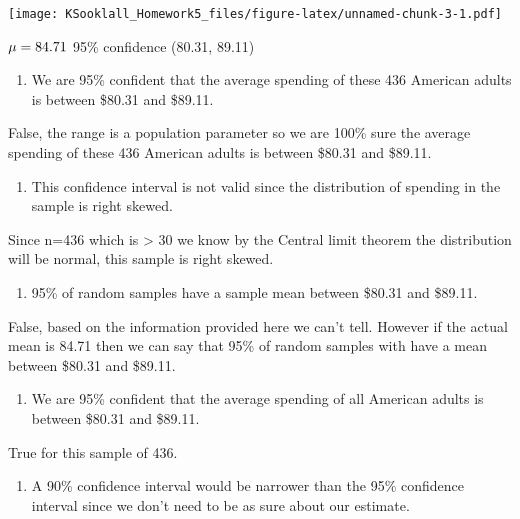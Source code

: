 \documentclass[
]{article}
\providecommand{\tightlist}{%
  \setlength{\itemsep}{0pt}\setlength{\parskip}{0pt}}
\begin{document}
\texttt{[image: KSooklall\_Homework5\_files/figure-latex/unnamed-chunk-3-1.pdf]}

\(\mu=84.71 \\\) 95\% confidence (80.31, 89.11)

\begin{enumerate}
\def\labelenumi{(\alph{enumi})}
\tightlist
\item
  We are 95\% confident that the average spending of these 436 American
  adults is between \$80.31 and \$89.11.
\end{enumerate}

False, the range is a population parameter so we are 100\% sure the
average spending of these 436 American adults is between \$80.31 and
\$89.11.

\begin{enumerate}
\def\labelenumi{(\alph{enumi})}
\setcounter{enumi}{1}
\tightlist
\item
  This confidence interval is not valid since the distribution of
  spending in the sample is right skewed.
\end{enumerate}

Since n=436 which is \textgreater{} 30 we know by the Central limit
theorem the distribution will be normal, this sample is right skewed.

\begin{enumerate}
\def\labelenumi{(\alph{enumi})}
\setcounter{enumi}{2}
\tightlist
\item
  95\% of random samples have a sample mean between \$80.31 and \$89.11.
\end{enumerate}

False, based on the information provided here we can't tell. However if
the actual mean is 84.71 then we can say that 95\% of random samples
with have a mean between \$80.31 and \$89.11.

\begin{enumerate}
\def\labelenumi{(\alph{enumi})}
\setcounter{enumi}{3}
\tightlist
\item
  We are 95\% confident that the average spending of all American adults
  is between \$80.31 and \$89.11.
\end{enumerate}

True for this sample of 436.

\begin{enumerate}
\def\labelenumi{(\alph{enumi})}
\setcounter{enumi}{4}
\tightlist
\item
  A 90\% confidence interval would be narrower than the 95\% confidence
  interval since we don't need to be as sure about our estimate.
\end{enumerate}
\end{document}
